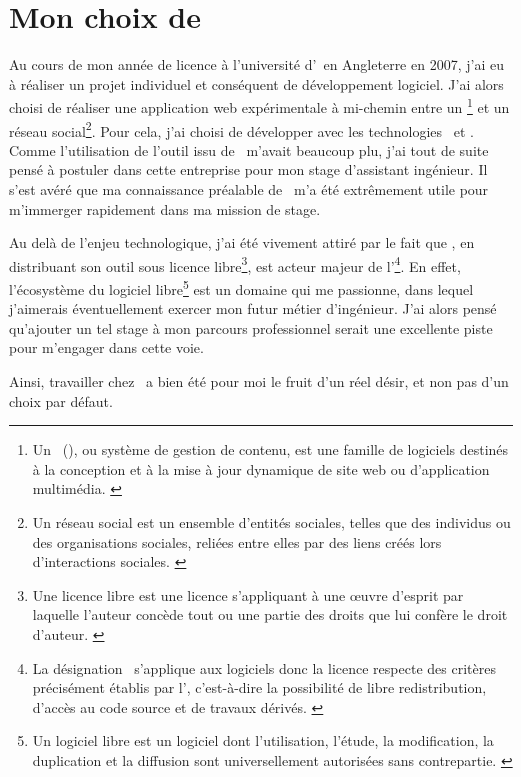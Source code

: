 \section{Mon choix de \asl}

Au cours de mon année de licence à l'université d'\abrookes\ en Angleterre en 2007, j'ai eu à réaliser un projet individuel et conséquent de développement logiciel. J'ai alors choisi de réaliser une application web expérimentale à mi-chemin entre un \acms\footnote{Un \acms\ (\acmsfull), ou système de gestion de contenu, est une famille de logiciels destinés à la conception et à la mise à jour dynamique de site web ou d'application multimédia. \cite{cms}} et un réseau social\footnote{Un réseau social est un ensemble d'entités sociales, telles que des individus ou des organisations sociales, reliées entre elles par des liens créés lors d'interactions sociales. \cite{reseausocial}}. Pour cela, j'ai choisi de développer avec les technologies \aphp\ et \asf. Comme l'utilisation de l'outil issu de \asl\ m'avait beaucoup plu, j'ai tout de suite pensé à postuler dans cette entreprise pour mon stage d'assistant ingénieur. Il s'est avéré que ma connaissance préalable de \asf\ m'a été extrêmement utile pour m'immerger rapidement dans ma mission de stage.

Au delà de l'enjeu technologique, j'ai été vivement attiré par le fait que \asl, en distribuant son outil sous licence libre\footnote{Une licence libre est une licence s'appliquant à une œuvre d'esprit par laquelle l'auteur concède tout ou une partie des droits que lui confère le droit d'auteur. \cite{licencelibre}}, est acteur majeur de l'\aos\footnote{La désignation \aos\ s'applique aux logiciels donc la licence respecte des critères précisément établis par l'\aosinitiative, c'est-à-dire la possibilité de libre redistribution, d'accès au code source et de travaux dérivés. \cite{os}}. En effet, l'écosystème du logiciel libre\footnote{Un logiciel libre est un logiciel dont l'utilisation, l'étude, la modification, la duplication et la diffusion sont universellement autorisées sans contrepartie. \cite{logiciellibre}} est un domaine qui me passionne, dans lequel j'aimerais éventuellement exercer mon futur métier d'ingénieur. J'ai alors pensé qu'ajouter un tel stage à mon parcours professionnel serait une excellente piste pour m'engager dans cette voie.

Ainsi, travailler chez \asl\ a bien été pour moi le fruit d'un réel désir, et non pas d'un choix par défaut.
